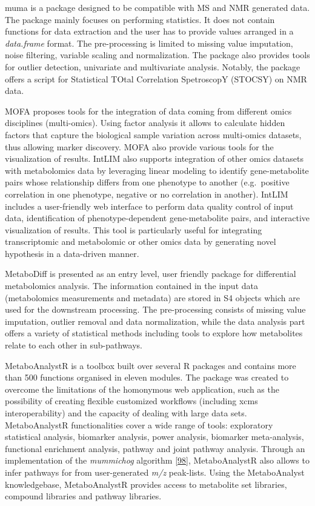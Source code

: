 \documentclass[]{article}
\begin{document}
muma is a package designed to be compatible with MS and NMR generated data. The package mainly focuses on performing statistics. It does not contain functions for data extraction and the user has to provide values arranged in a \emph{data.frame} format. The pre-processing is limited to missing value imputation, noise filtering, variable scaling and normalization. The package also provides tools for outlier detection, univariate and multivariate analysis. Notably, the package offers a script for Statistical TOtal Correlation SpetroscopY (STOCSY) on NMR data.

MOFA proposes tools for the integration of data coming from different omics disciplines (multi-omics). Using factor analysis it allows to calculate hidden factors that capture the biological sample variation across multi-omics datasets, thus allowing marker discovery. MOFA also provide various tools for the visualization of results. IntLIM also supports integration of other omics datasets with metabolomics data by leveraging linear modeling to identify gene-metabolite pairs whose relationship differs from one phenotype to another (e.g.~positive correlation in one phenotype, negative or no correlation in another). IntLIM includes a user-friendly web interface to perform data quality control of input data, identification of phenotype-dependent gene-metabolite pairs, and interactive visualization of results. This tool is particularly useful for integrating transcriptomic and metabolomic or other omics data by generating novel hypothesis in a data-driven manner.

MetaboDiff is presented as an entry level, user friendly package for differential metabolomics analysis. The information contained in the input data (metabolomics measurements and metadata) are stored in S4 objects which are used for the downstream processing. The pre-processing consists of missing value imputation, outlier removal and data normalization, while the data analysis part offers a variety of statistical methods including tools to explore how metabolites relate to each other in sub-pathways.

MetaboAnalystR is a toolbox built over several R packages and contains more than 500 functions organised in eleven modules. The package was created to overcome the limitations of the homonymous web application, such as the possibility of creating flexible customized workflows (including xcms interoperability) and the capacity of dealing with large data sets. MetaboAnalystR functionalities cover a wide range of tools: exploratory statistical analysis, biomarker analysis, power analysis, biomarker meta-analysis, functional enrichment analysis, pathway and joint pathway analysis. Through an implementation of the \emph{mummichog} algorithm {[}\protect\hyperlink{ref-li_2013}{98}{]}, MetaboAnalystR also allows to infer pathways for from user-generated \emph{m/z} peak-lists. Using the MetaboAnalyst knowledgebase, MetaboAnalystR provides access to metabolite set libraries, compound libraries and pathway libraries.
\end{document}
